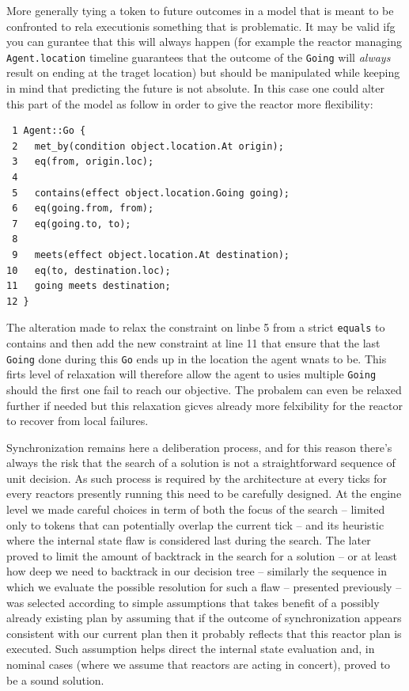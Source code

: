 More generally tying a token
to future outcomes in a model that is meant to be confronted to rela
executionis something that is problematic. It may be valid ifg you can
gurantee that this will always happen (for example the reactor
managing \texttt{Agent.location} timeline guarantees that the outcome
of the \texttt{Going} will {\em always} result on ending at the traget
location) but should be manipulated while keeping in mind that
predicting the future is not absolute. In this case one could alter
this part of the model as follow in order to give the reactor more
flexibility:
\begin{verbatim}
 1 Agent::Go {
 2   met_by(condition object.location.At origin);
 3   eq(from, origin.loc);
 4
 5   contains(effect object.location.Going going);
 6   eq(going.from, from);
 7   eq(going.to, to);
 8   
 9   meets(effect object.location.At destination);
10   eq(to, destination.loc);
11   going meets destination;
12 }
\end{verbatim}
The alteration made to relax the constraint on linbe 5 from a strict 
\texttt{equals} to contains and then add the new constraint at line 11
that ensure that the last \texttt{Going} done during this \texttt{Go}
ends up in the location the agent wnats to be. This firts level of
relaxation will therefore allow the agent to usies multiple
\texttt{Going} should the first one fail to reach our objective.  The
probalem can even be relaxed further if needed but this relaxation
gicves already more felxibility for the reactor to recover from local
failures.

Synchronization remains here a deliberation process, and for this
reason there's always the risk that the search of a solution is not a
straightforward sequence of unit decision. As such process is required
by the architecture at every ticks for every reactors presently
running this need to be carefully designed. At the engine level we
made careful choices in term of both the focus of the search --
limited only to tokens that can potentially overlap the current tick
-- and its heuristic where the internal state flaw is considered last
during the search. The later proved to limit the amount of backtrack
in the search for a solution -- or at least how deep we need to
backtrack in our decision tree -- similarly the sequence in which we
evaluate the possible resolution for such a flaw -- presented
previously -- was selected according to simple assumptions that takes
benefit of a possibly already existing plan by assuming that if the
outcome of synchronization appears consistent with our current plan
then it probably reflects that this reactor plan is executed. Such
assumption helps direct the internal state evaluation and, in nominal
cases (where we assume that reactors are acting in concert), proved to
be a sound solution.

